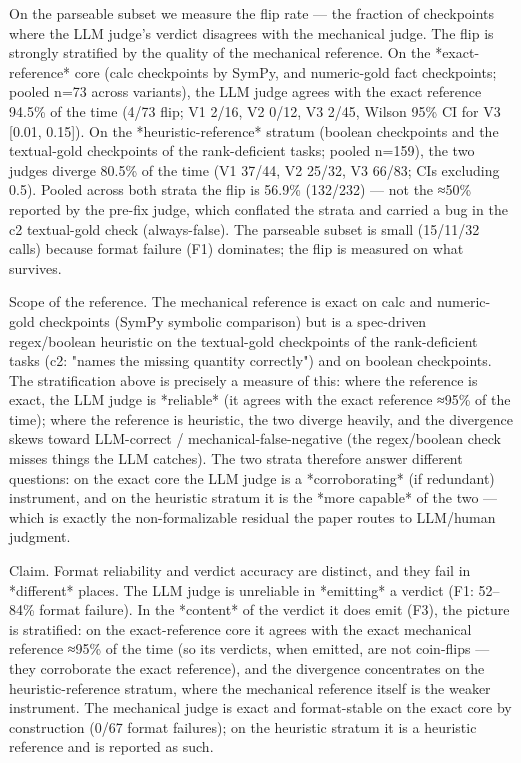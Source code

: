 \documentclass[10pt,twocolumn]{article}
\begin{document}
On the parseable subset we measure the flip rate — the fraction of checkpoints where the LLM judge's verdict disagrees with the mechanical judge. The flip is strongly stratified by the quality of the mechanical reference. On the *exact-reference* core (calc checkpoints by SymPy, and numeric-gold fact checkpoints; pooled n=73 across variants), the LLM judge agrees with the exact reference 94.5\% of the time (4/73 flip; V1 2/16, V2 0/12, V3 2/45, Wilson 95\% CI for V3 [0.01, 0.15]). On the *heuristic-reference* stratum (boolean checkpoints and the textual-gold checkpoints of the rank-deficient tasks; pooled n=159), the two judges diverge 80.5\% of the time (V1 37/44, V2 25/32, V3 66/83; CIs excluding 0.5). Pooled across both strata the flip is 56.9\% (132/232) — not the ≈50\% reported by the pre-fix judge, which conflated the strata and carried a bug in the c2 textual-gold check (always-false). The parseable subset is small (15/11/32 calls) because format failure (F1) dominates; the flip is measured on what survives.


Scope of the reference. The mechanical reference is exact on calc and numeric-gold checkpoints (SymPy symbolic comparison) but is a spec-driven regex/boolean heuristic on the textual-gold checkpoints of the rank-deficient tasks (c2: "names the missing quantity correctly") and on boolean checkpoints. The stratification above is precisely a measure of this: where the reference is exact, the LLM judge is *reliable* (it agrees with the exact reference ≈95\% of the time); where the reference is heuristic, the two diverge heavily, and the divergence skews toward LLM-correct / mechanical-false-negative (the regex/boolean check misses things the LLM catches). The two strata therefore answer different questions: on the exact core the LLM judge is a *corroborating* (if redundant) instrument, and on the heuristic stratum it is the *more capable* of the two — which is exactly the non-formalizable residual the paper routes to LLM/human judgment.


Claim. Format reliability and verdict accuracy are distinct, and they fail in *different* places. The LLM judge is unreliable in *emitting* a verdict (F1: 52–84\% format failure). In the *content* of the verdict it does emit (F3), the picture is stratified: on the exact-reference core it agrees with the exact mechanical reference ≈95\% of the time (so its verdicts, when emitted, are not coin-flips — they corroborate the exact reference), and the divergence concentrates on the heuristic-reference stratum, where the mechanical reference itself is the weaker instrument. The mechanical judge is exact and format-stable on the exact core by construction (0/67 format failures); on the heuristic stratum it is a heuristic reference and is reported as such.
\end{document}
